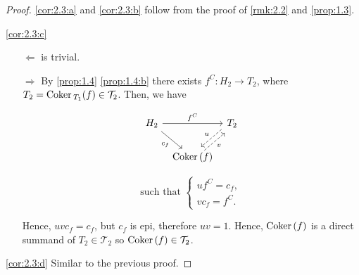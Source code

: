 \begin{proof}
  \ref{cor:2.3:a} and \ref{cor:2.3:b} follow from the proof of \cref{rmk:2.2}
  and \cref{prop:1.3}.

  \ref{cor:2.3:c}
  \begin{enumerate}
    \item[$\Leftarrow$] is trivial.
    \item[$\Rightarrow$] By \cref{prop:1.4} \ref{prop:1.4:b} there exists $f^C:H_2\to T_2$, where
      $T_2=\mathrm{\textup{Coker\,}}_{T_1}(f)\in\mathcal{T}_2$. Then, we have

      \begin{minipage}[b]{0.45\linewidth}
        \begin{equation*}
          \begin{tikzcd}[column sep=tiny]
            H_2\arrow{rr}{f^C}\arrow{dr}[']{c_f}
              & & T_2 \arrow[dashed, shift right]{ld}[']{u}\\
              & \Coker(f)\arrow[dashed, shift right]{ur}[']{v}
          \end{tikzcd}
        \end{equation*}
      \end{minipage}
      \begin{minipage}[b]{0.45\linewidth}
        \begin{equation*}
          \text{such that }
          \left\{
          \begin{array}{c}
            uf^C = c_f,\\
            vc_f = f^C.
          \end{array}
          \right.
        \end{equation*}
      \end{minipage}

      Hence, $uvc_f=c_f$, but $c_f$ is epi, therefore $uv=1$. Hence, $\mathrm{\textup{Coker\,}}(f)$ is a direct
      summand of $T_2\in\mathcal{T}_2$ so $\mathrm{\textup{Coker\,}}(f)\in\mathcal{T}_2$.
  \end{enumerate}

  \ref{cor:2.3:d} Similar to the previous proof.
\end{proof}


